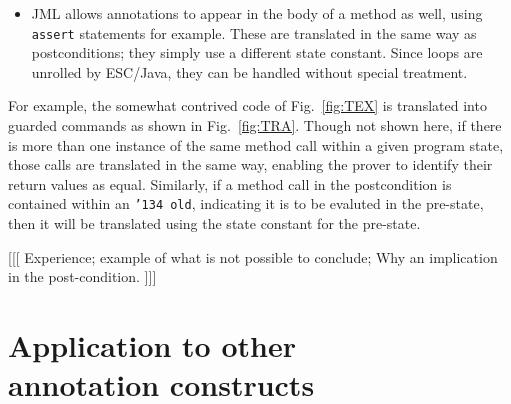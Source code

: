 \documentclass{sig-alternate}
\begin{document}
\begin{itemize}
{             next(stateX,object,i) == i + 1; ))} . \\
Since we do not extract values (e.g. of fields) out of a program state, we do not quantify over
the state constant.  Instead we repeat the assumption above in each context where the method
is called and translate any free variables in the context of that call.
\item JML allows annotations to appear in the body of a method as well, using \texttt{assert}
statements for example.  These are translated in the same way as postconditions; they simply
use a different state constant.  Since loops are unrolled by ESC/Java, they can be
handled without special treatment.
\end{itemize}

For example, the somewhat contrived code of Fig.~\ref{fig:TEX} is translated into guarded 
commands as shown in Fig.~\ref{fig:TRA}.  Though not shown here, if 
there is
more than one instance of the same method call within a given program state, those calls are
translated in the same way, enabling the prover to identify their return values as equal.  Similarly, if
a method call in the postcondition is contained within an \texttt{\char'134 old}, indicating it is to
be evaluted in the pre-state, then it will be translated using the state constant for the pre-state.

\begin{BFIGURE}

\caption{A somewhat contrived example to illustrate the translations of method calls.
To avoid needing an explanation of
 details of guarded commands and the translation that are not relevant to this discussion, this
is an approximation of the relevant part of the generated guarded command.}
\label{fig:TEX}
\end{BFIGURE}

\begin{BFIGURE}

\caption{A sketch of the translation of method Example.accumulateMin.}
\label{fig:TRA}
\end{BFIGURE}

[[[ Experience; example of what is not possible to conclude; Why an implication in the post-condition. ]]]

\section{Application to other \\ annotation constructs}
\end{document}
